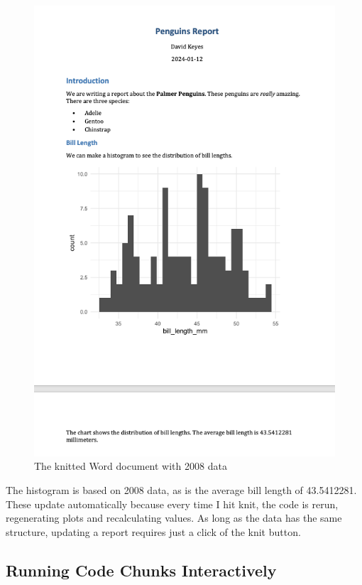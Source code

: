 \documentclass[
]{book}
\begin{document}
\begin{figure}
\includegraphics[width=1\linewidth]{assets/penguins-report-2008} \caption{The knitted Word document with 2008 data}\label{fig:penguins-report-2008}
\end{figure}

The histogram is based on 2008 data, as is the average bill length of 43.5412281. These update automatically because every time I hit knit, the code is rerun, regenerating plots and recalculating values. As long as the data has the same structure, updating a report requires just a click of the knit button.

\hypertarget{running-code-chunks-interactively}{%
\subsection*{Running Code Chunks Interactively}\label{running-code-chunks-interactively}}
\end{document}
